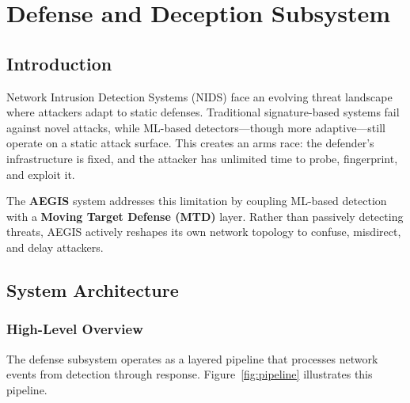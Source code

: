 
\chapter{Defense and Deception Subsystem}\label{ch:defense}

\section{Introduction}

Network Intrusion Detection Systems (NIDS) face an evolving threat landscape where attackers adapt to static defenses. Traditional signature-based systems fail against novel attacks, while ML-based detectors---though more adaptive---still operate on a static attack surface. This creates an arms race: the defender's infrastructure is fixed, and the attacker has unlimited time to probe, fingerprint, and exploit it.

The \textbf{AEGIS} system addresses this limitation by coupling ML-based detection with a \textbf{Moving Target Defense (MTD)} layer. Rather than passively detecting threats, AEGIS actively reshapes its own network topology to confuse, misdirect, and delay attackers.

\section{System Architecture}

\subsection{High-Level Overview}

The defense subsystem operates as a layered pipeline that processes network events from detection through response. Figure~\ref{fig:pipeline} illustrates this pipeline.

